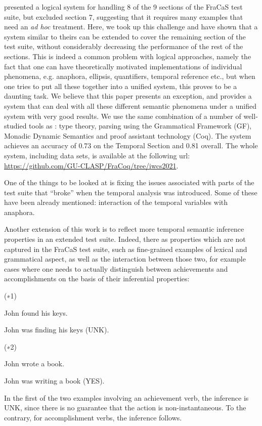 \documentclass[11pt,a4paper]{article}
\newcommand\hyp{\item[H]}
\newcommand\fracasex[2]{\begin{lingex}\item[(#1)] \begin{subex} #2 \end{subex} \end{lingex} }
\begin{document}
\citet{bernardy_wide-coverage_2019} presented a logical system for
handling 8 of the 9 sections of the FraCaS test suite, but excluded
section 7, suggesting that it requires many examples that need an
\textit{ad hoc} treatment. Here, we took up this challenge and have
shown that a system similar to theirs can be extended to cover the
remaining section of the test suite, without considerably decreasing
the performance of the rest of the sections. This is indeed a common
problem with logical approaches, namely the fact that one can have
theoretically motivated implementations of individual phenomena,
e.g. anaphora, ellipsis, quantifiers, temporal reference etc., but
when one tries to put all these together into a unified system, this
proves to be a daunting task. We believe that this paper presents an
exception, and provides a system that can deal with all these
different semantic phenomena under a unified system with very good
results.
%
We use the same combination of a number of well-studied tools as \citet{bernardy_wide-coverage_2019} : type
theory, parsing using the Grammatical Framework (GF), Monadic Dynamic
Semantics and proof assistant technology (Coq). The system achieves an
accuracy of 0.73 on the Temporal Section and 0.81 overall. The whole
system, including data sets, is available at the following url:
\url{https://github.com/GU-CLASP/FraCoq/tree/iwcs2021}.

One of the things to be looked at is fixing the issues associated with
parts of the test suite that ``broke'' when the temporal analysis was
introduced. Some of these have been already mentioned: interaction of
the temporal variables with anaphora.

Another extension of this work is to reflect more temporal semantic
inference properties in an extended test suite. Indeed, there as properties which are
not captured in the FraCaS test suite, such as fine-grained examples of lexical and
grammatical aspect, as well as the interaction between those two, for example
cases where one needs to actually distinguish between achievements and
accomplishments on the basis of their inferential properties:

\fracasex{∗1}{
	\item	John found his keys.  
	\hyp 	John was finding his keys  (UNK).
}

\fracasex{∗2}{
	\item	John wrote a book.  
	\hyp 	John was writing a book  (YES).
}

In the first of the two examples involving an achievement verb, the
inference is UNK, since there is no guarantee that the action is
non-instantaneous. To the contrary, for accomplishment verbs, the
inference follows.
\end{document}
